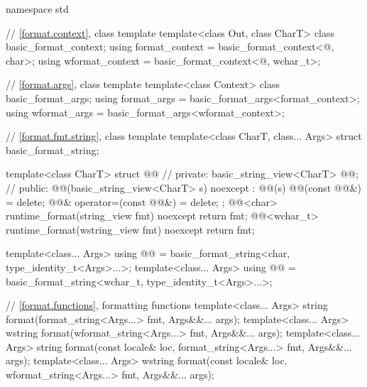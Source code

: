 %
%
%
%
%
%
%
%
%
%
\begin{codeblock}
namespace std {
  // \ref{format.context}, class template 
  template<class Out, class CharT> class basic_format_context;
  using format_context = basic_format_context<@\unspec@, char>;
  using wformat_context = basic_format_context<@\unspec@, wchar_t>;

  // \ref{format.args}, class template 
  template<class Context> class basic_format_args;
  using format_args = basic_format_args<format_context>;
  using wformat_args = basic_format_args<wformat_context>;

  // \ref{format.fmt.string}, class template 
  template<class CharT, class... Args>
    struct basic_format_string;

  template<class CharT> struct @@ {                  // \expos
  private:
    basic_string_view<CharT> @@;                                       // \expos
  public:
    @@(basic_string_view<CharT> s) noexcept : @@(s) {}
    @@(const @@&) = delete;
    @@& operator=(const @@&) = delete;
  };
  @@<char> runtime_format(string_view fmt) noexcept { return fmt; }
  @@<wchar_t> runtime_format(wstring_view fmt) noexcept { return fmt; }

  template<class... Args>
    using @@ = basic_format_string<char, type_identity_t<Args>...>;
  template<class... Args>
    using @@ = basic_format_string<wchar_t, type_identity_t<Args>...>;

  // \ref{format.functions}, formatting functions
  template<class... Args>
    string format(format_string<Args...> fmt, Args&&... args);
  template<class... Args>
    wstring format(wformat_string<Args...> fmt, Args&&... args);
  template<class... Args>
    string format(const locale& loc, format_string<Args...> fmt, Args&&... args);
  template<class... Args>
    wstring format(const locale& loc, wformat_string<Args...> fmt, Args&&... args);

}
\end{codeblock}

